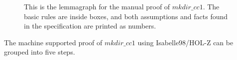  \begin{figure}
 \begin{center}

 \end{center}
 \caption{This is the lemmagraph for the manual proof of $mkdir\_cc1$. The basic rules are inside boxes, and both assumptions and facts found in the specification are printed as numbers.}
 \end{figure}
%
% 
%
The machine supported proof of $mkdir\_cc1$ using Isabelle98/HOL-Z can be grouped into five steps.

